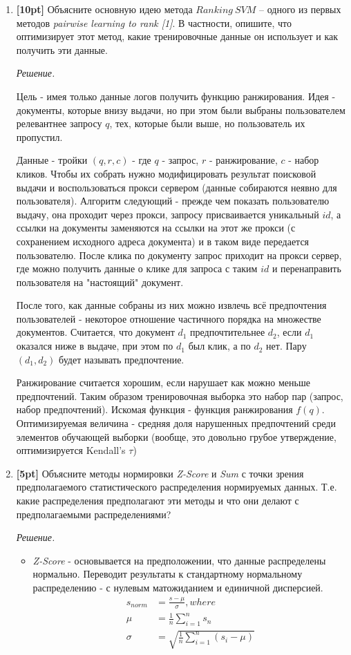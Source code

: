 \begin{enumerate}
	\item \textbf{[10pt]} Объясните основную идею метода $Ranking \ SVM$ – одного из первых 
	методов	\textit{pairwise learning to rank [1]}. В частности, опишите, что оптимизирует этот 
	метод, какие тренировочные данные он использует и как получить эти данные.
	
	\textit{Решение.}
	
	Цель - имея только данные логов получить функцию ранжирования. Идея - документы, которые внизу выдачи, но при этом были выбраны пользователем релевантнее запросу $q$, тех, которые были выше, но пользователь их пропустил.
	
	Данные - тройки $(q, r, c)$ - где $q$ - запрос, $r$ - ранжирование, $c$ - набор кликов. Чтобы 
	их собрать нужно модифицировать результат поисковой выдачи и воспользоваться прокси сервером 
	(данные собираются неявно для пользователя). Алгоритм следующий - прежде чем показать 
	пользователю выдачу, она проходит через прокси, запросу присваивается уникальный $id$, а 
	ссылки на документы заменяются на ссылки на этот же прокси (с сохранением исходного адреса 
	документа) и в таком виде передается пользователю. После клика по документу запрос приходит на 
	прокси сервер, где можно получить данные о клике для запроса с таким $id$ и перенаправить 
	пользователя на "настоящий" документ.
	
	После того, как данные собраны из них можно извлечь всё предпочтения пользователей - некоторое 
	отношение частичного порядка на множестве документов. Считается, что документ $d_1$ 
	предпочтительнее $d_2$, если $d_1$ оказался ниже в выдаче, при этом по $d_1$ был клик, а по 
	$d_2$ нет. Пару $(d_1, d_2)$ будет называть предпочтение.
	
	Ранжирование считается хорошим, если нарушает как можно меньше предпочтений. Таким образом 
	тренировочная выборка это набор пар (запрос, набор предпочтений). Искомая функция - функция 
	ранжирования $f(q)$. Оптимизируемая величина - средняя доля нарушенных предпочтений среди 
	элементов обучающей выборки (вообще, это довольно грубое утверждение, оптимизируется Kendall's 
	$\tau$)
	
	\item \textbf{[5pt]} Объясните методы нормировки \textit{Z-Score} и \textit{Sum} с точки 
	зрения предполагаемого статистического распределения нормируемых данных. Т.е. какие 
	распределения предполагают эти методы и что они делают с предполагаемыми распределениями?
	
	\textit{Решение.}
	\begin{itemize}
		\item \textit{Z-Score} - основывается на предположении, что данные распределены нормально. Переводит результаты к стандартному нормальному распределению - с нулевым матожиданием и единичной дисперсией.
		\begin{align*}
			s_{norm} &= \frac{s - \mu}{\sigma}, where\\
			\mu &= \frac{1}{n} \sum\limits_{i = 1}^n s_n\\
			\sigma &= \sqrt{\frac{1}{n} \sum\limits_{i = 1}^n (s_i - \mu)}
		\end{align*}
		

\end{itemize}
\end{enumerate}
